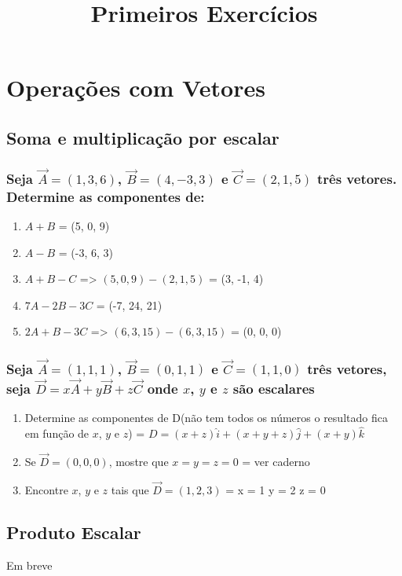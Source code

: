 \documentclass[a4paper,10pt]{article}
\title{Primeiros Exercícios}
\author{}
\begin{document}
\maketitle

\section{Operações com Vetores}

\subsection{Soma e multiplicação por escalar}

\subsubsection{Seja $\vec{A}=(1,3,6)$, $\vec{B}=(4,-3,3)$ e $\vec{C}=(2,1,5)$ três vetores. Determine as componentes de:}

\begin{enumerate}
 \item $A + B$ = 
 (5, 0, 9) 
 
 \item $A - B$ = 
 (-3, 6, 3)
 
 \item $A + B - C$ =>
  $(5, 0, 9) - (2, 1, 5)$ = (3, -1, 4)
 
 \item $7A - 2B - 3C$ = 
 (-7, 24, 21)
 
 \item $2A + B - 3C$ => 
 $(6, 3, 15) - (6, 3, 15)$ = (0, 0, 0)

\end{enumerate}

\subsubsection{Seja $\vec{A}=(1,1,1)$, $\vec{B}=(0,1,1)$ e $\vec{C}=(1,1,0)$ três vetores, seja 
$\vec{D}=x\vec{A} + y\vec{B} + z\vec{C}$ onde $x$, $y$ e $z$ são escalares}


\begin{enumerate}
 \item Determine as componentes de D(não tem todos os números o resultado fica em função de $x$, $y$ e $z$) =  
 $D = (x + z)\hat{i} + (x + y + z)\hat{j} + (x + y)\hat{k}$
 
 
  
 \item Se $\vec{D}=(0,0,0)$, mostre que $x=y=z=0$ =  
 ver caderno
 
 \item Encontre $x$, $y$ e $z$ tais que $\vec{D}=(1,2,3)$ = 
 x = 1
 y = 2
 z = 0
 
\end{enumerate}

\subsection{Produto Escalar}

Em breve
\end{document}
